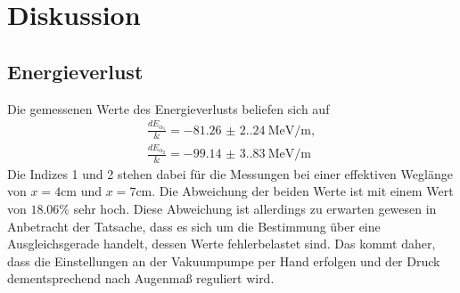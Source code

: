 \section{Diskussion}
\label{sec:Diskussion}

\subsection{Energieverlust}
Die gemessenen Werte des Energieverlusts beliefen sich auf 
\begin{align*}
    \frac{dE_{\alpha_1}} &= \qty{-81.26(2.24)}{\mega\electronvolt\per\meter}, \\
    \frac{dE_{\alpha_2}} &= \qty{-99.14(3.83)}{\mega\electronvolt\per\meter}
\end{align*}
Die Indizes 1 und 2 stehen dabei für die Messungen bei einer effektiven 
Weglänge von $x = 4 \unit{\centi\meter}$ und $x = 7 \unit{\centi\meter}$.
Die Abweichung der beiden Werte ist mit einem Wert von $18.06 \%$ sehr hoch.
Diese Abweichung ist allerdings zu erwarten gewesen in Anbetracht der Tatsache, 
dass es sich um die Bestimmung über eine Ausgleichsgerade handelt, dessen Werte 
fehlerbelastet sind. Das kommt daher, dass die Einstellungen an der Vakuumpumpe 
per Hand erfolgen und der Druck dementsprechend nach Augenmaß reguliert wird. 
